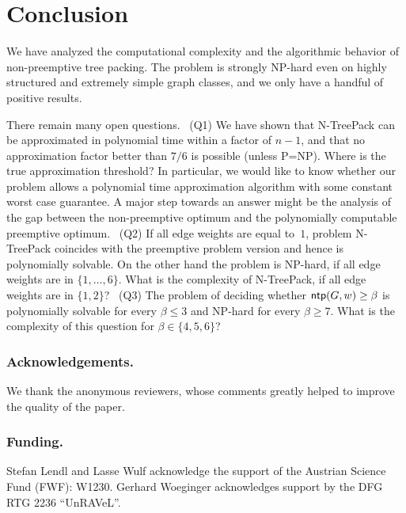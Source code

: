 \documentclass[runningheads]{llncs}
\newcommand{\set}[1]{\{ #1 \}}
\newcommand{\fromto}[2]{\set{#1, \ldots, #2}}
\newcommand{\xxxNTP}{{\sc N-TreePack}}
\DeclareMathOperator{\ntp}{\text{\sf ntp}}
\newcommand{\lasse}[1]{#1}
\begin{document}


\section{Conclusion}
\label{sec:conclusion}
We have analyzed the computational complexity and the algorithmic behavior of non-preemptive
tree packing.
The problem is strongly NP-hard even on highly structured and extremely simple graph classes,
and we only have a handful of positive results.

There remain many open questions.
~(Q1) We have shown that {\xxxNTP} can be approximated in polynomial time within a factor of $n-1$, 
and that no approximation factor better than $7/6$ is possible (unless P=NP).
Where is the true approximation threshold?
In particular, we would like to know whether our problem allows a polynomial time approximation
algorithm with some constant worst case guarantee.
A major step towards an answer might be the analysis of the gap between the non-preemptive optimum 
and the polynomially computable preemptive optimum.
~(Q2) If all edge weights are equal to~$1$, problem {\xxxNTP} coincides with the preemptive problem 
version and hence is polynomially solvable.
On the other hand the problem is NP-hard, if all edge weights are in $\fromto{1}{6}$. 
What is the complexity of {\xxxNTP}, if all edge weights are in $\{1,2\}$?
~(Q3) The problem of deciding whether $\ntp(G,w)\ge\beta$ is polynomially solvable for 
every $\beta\le3$ and NP-hard for every $\beta\ge7$.
What is the complexity of this question for $\beta\in\{4,5,6\}$?


\subsubsection*{Acknowledgements.}
\lasse{We thank the anonymous reviewers, whose comments greatly helped to improve the quality of the paper.} 

\subsubsection*{Funding.}
Stefan Lendl and Lasse Wulf acknowledge the support of the Austrian Science Fund (FWF): W1230.
Gerhard Woeginger acknowledges support by the DFG RTG 2236 ``UnRAVeL''.
\end{document}
